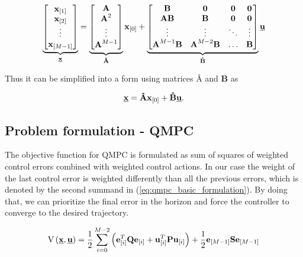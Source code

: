 \begin{equation}
\label{eq:prediction_big}
\underbrace{
\begin{bmatrix}
\textbf{x}_{[1]} \\
\textbf{x}_{[2]} \\
\vdots \\
\textbf{x}_{[M-1]} \\
\end{bmatrix}}_{\textbf{\underline{x}}}
=
\underbrace{
\begin{bmatrix}
\textbf{A} \\
\textbf{A}^2 \\
\vdots \\
\textbf{A}^{M-1} \\
\end{bmatrix}}_{\textbf{\^A}}
\textbf{x}_{[0]}
+
\underbrace{
\begin{bmatrix}
\textbf{B} & \textbf{0} & \textbf{0} & \textbf{0} \\
\textbf{AB} & \textbf{B} & \textbf{0} & \textbf{0} \\
\vdots & \vdots & \ddots & \vdots \\
\textbf{A}^{M-1}\textbf{B} & \textbf{A}^{M-2}\textbf{B} & \hdots & \textbf{B}
\end{bmatrix}
}_{\textbf{\^B}}\underline{\textbf{u}}
\end{equation}

Thus it can be simplified into a form using matrices $\textbf{\^A}$ and $\textbf{\^B}$ as

\begin{equation}
\textbf{\underline{x}} = \textbf{\^A}\textbf{x}_{[0]} + \textbf{\^B}\textbf{\underline{u}}.
\label{eq:prediction_final}
\end{equation}

\subsection{Problem formulation - QMPC}
\label{cap:mpc_formulation}

The objective function for QMPC is formulated as sum of squares of weighted control errors combined with weighted control actions. In our case the weight of the last control error is weighted differently than all the previous errors, which is denoted by the second summand in (\ref{eq:qmpc_basic_formulation}). By doing that, we can prioritize the final error in the horizon and force the controller to converge to the desired trajectory.

\begin{equation}
\label{eq:qmpc_basic_formulation}
\mathrm{V}\left(\textbf{\underline{x}}, \textbf{\underline{u}}\right) = \frac{1}{2}\sum_{i=0}^{M-2}\left(\textbf{e}^T_{[i]}\textbf{Q}\textbf{e}_{[i]} + \textbf{u}^T_{[i]}\textbf{P}\textbf{u}_{[i]}\right) + \frac{1}{2}\textbf{e}_{[M-1]}\textbf{S}\textbf{e}_{[M-1]}
\end{equation}

